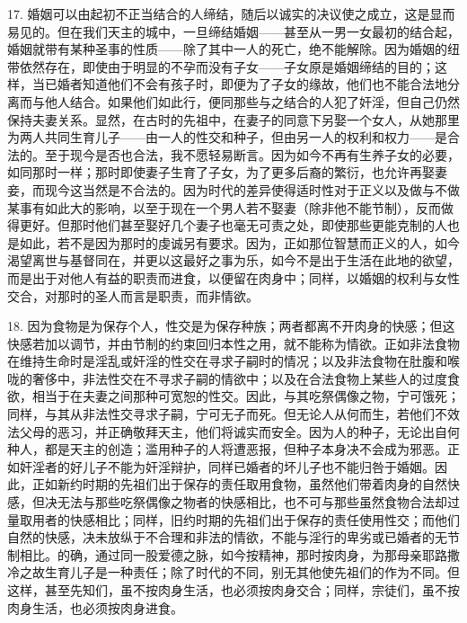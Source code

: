 17. 婚姻可以由起初不正当结合的人缔结，随后以诚实的决议使之成立，这是显而易见的。但在我们天主的城中，一旦缔结婚姻——甚至从一男一女最初的结合起，婚姻就带有某种圣事的性质——除了其中一人的死亡，绝不能解除。因为婚姻的纽带依然存在，即使由于明显的不孕而没有子女——子女原是婚姻缔结的目的；这样，当已婚者知道他们不会有孩子时，即便为了子女的缘故，他们也不能合法地分离而与他人结合。如果他们如此行，便同那些与之结合的人犯了奸淫，但自己仍然保持夫妻关系。显然，在古时的先祖中，在妻子的同意下另娶一个女人，从她那里为两人共同生育儿子——由一人的性交和种子，但由另一人的权利和权力——是合法的。至于现今是否也合法，我不愿轻易断言。因为如今不再有生养子女的必要，如同那时一样；那时即使妻子生育了子女，为了更多后裔的繁衍，也允许再娶妻妾，而现今这当然是不合法的。因为时代的差异使得适时性对于正义以及做与不做某事有如此大的影响，以至于现在一个男人若不娶妻（除非他不能节制），反而做得更好。但那时他们甚至娶好几个妻子也毫无可责之处，即使那些更能克制的人也是如此，若不是因为那时的虔诚另有要求。因为，正如那位智慧而正义的人，如今渴望离世与基督同在，并更以这最好之事为乐，如今不是出于生活在此地的欲望，而是出于对他人有益的职责而进食，以便留在肉身中；同样，以婚姻的权利与女性交合，对那时的圣人而言是职责，而非情欲。\par

18. 因为食物是为保存个人，性交是为保存种族；两者都离不开肉身的快感；但这快感若加以调节，并由节制的约束回归本性之用，就不能称为情欲。正如非法食物在维持生命时是淫乱或奸淫的性交在寻求子嗣时的情况；以及非法食物在肚腹和喉咙的奢侈中，非法性交在不寻求子嗣的情欲中；以及在合法食物上某些人的过度食欲，相当于在夫妻之间那种可宽恕的性交。因此，与其吃祭偶像之物，宁可饿死；同样，与其从非法性交寻求子嗣，宁可无子而死。但无论人从何而生，若他们不效法父母的恶习，并正确敬拜天主，他们将诚实而安全。因为人的种子，无论出自何种人，都是天主的创造；滥用种子的人将遭恶报，但种子本身决不会成为邪恶。正如奸淫者的好儿子不能为奸淫辩护，同样已婚者的坏儿子也不能归咎于婚姻。因此，正如新约时期的先祖们出于保存的责任取用食物，虽然他们带着肉身的自然快感，但决无法与那些吃祭偶像之物者的快感相比，也不可与那些虽然食物合法却过量取用者的快感相比；同样，旧约时期的先祖们出于保存的责任使用性交；而他们自然的快感，决未放纵于不合理和非法的情欲，不能与淫行的卑劣或已婚者的无节制相比。的确，通过同一股爱德之脉，如今按精神，那时按肉身，为那母亲耶路撒冷之故生育儿子是一种责任；除了时代的不同，别无其他使先祖们的作为不同。但这样，甚至先知们，虽不按肉身生活，也必须按肉身交合；同样，宗徒们，虽不按肉身生活，也必须按肉身进食。\par

